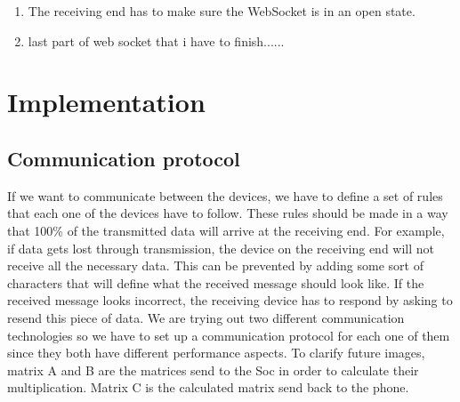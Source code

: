\documentclass[a4paper, 11pt]{report}
\begin{document}
	\begin{enumerate}
		\item The receiving end has to make sure the WebSocket is in an open state. 
		\item last part of web socket that i have to finish......
	\end{enumerate}
		

	
	
	\chapter{Implementation}
	
	
\section{Communication protocol}
If we want to communicate between the devices, we have to define a set of rules that each one of the devices have to follow. These rules should be made in a way that 100\% of the transmitted data will arrive at the receiving end. For example, if data gets lost through transmission, the device on the receiving end will not receive all the necessary data. This can be prevented by adding some sort of characters that will define what the received message should look like. If the received message looks incorrect, the receiving device has to respond by asking to resend this piece of data. We are trying out two different communication technologies so we have to set up a communication protocol for each one of them since they both have different performance aspects. To clarify future images, matrix A and B are the matrices send to the Soc in order to calculate their multiplication. Matrix C is the calculated matrix send back to the phone.
\end{document}
